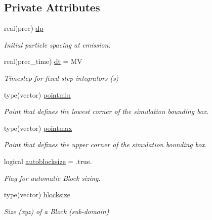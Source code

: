 \subsection*{Private Attributes}
\begin{DoxyCompactItemize}
\item 
real(prec) \mbox{\hyperlink{structsimulation__globals__mod_1_1simdefs__t_af730c363daf57cdb66206b7cc7e3d8ff}{dp}}
\begin{DoxyCompactList}\small\item\em Initial particle spacing at emission. \end{DoxyCompactList}\item 
real(prec\+\_\+time) \mbox{\hyperlink{structsimulation__globals__mod_1_1simdefs__t_acc8df5cd09283215deb732d97b44f1dc}{dt}} = MV
\begin{DoxyCompactList}\small\item\em Timestep for fixed step integrators (s) \end{DoxyCompactList}\item 
type(vector) \mbox{\hyperlink{structsimulation__globals__mod_1_1simdefs__t_af3a5fb325c955840515f199c8be30aa7}{pointmin}}
\begin{DoxyCompactList}\small\item\em Point that defines the lowest corner of the simulation bounding box. \end{DoxyCompactList}\item 
type(vector) \mbox{\hyperlink{structsimulation__globals__mod_1_1simdefs__t_a0437ce61f2882028c5e3ca0212aeaf24}{pointmax}}
\begin{DoxyCompactList}\small\item\em Point that defines the upper corner of the simulation bounding box. \end{DoxyCompactList}\item 
logical \mbox{\hyperlink{structsimulation__globals__mod_1_1simdefs__t_a3ff72d630a17daa1ca1494e67bc6d087}{autoblocksize}} = .true.
\begin{DoxyCompactList}\small\item\em Flag for automatic Block sizing. \end{DoxyCompactList}\item 
type(vector) \mbox{\hyperlink{structsimulation__globals__mod_1_1simdefs__t_a7ed40e8b9c4062d6e461b6187c3115b1}{blocksize}}
\begin{DoxyCompactList}\small\item\em Size (xyz) of a Block (sub-\/domain) \end{DoxyCompactList}\item 

\end{DoxyCompactItemize}
